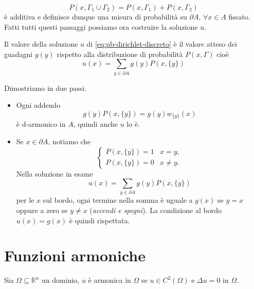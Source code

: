 \documentclass[10pt,a4paper,twoside,openright]{book}
\begin{document}
\begin{equation*}
	P( x,\Gamma _{1} \cup \Gamma _{2}) =P(x,\Gamma _{1}) +P(x,\Gamma _{2})
\end{equation*}
è additiva e definisce dunque una misura di probabilità su $\displaystyle \partial A$, $\displaystyle \forall x\in A$ fissato. Fatti tutti questi passaggi possiamo ora costruire la soluzione $\displaystyle u$.
\begin{theorem}
	Il valore della soluzione $u$ di \eqref{eq:pb-dirichlet-discreto} è il valore atteso dei guadagni $g(y)$ rispetto alla distribuzione di probabilità $P(x,\Gamma)$ cioè
	\begin{equation*}
		u(x) =\sum _{y\in \partial A} g(y) P(x,\{y\})
	\end{equation*}
\end{theorem}
\begin{dimostrazione} Dimostriamo in due passi.
	\begin{itemize}
		\item Ogni addendo
		\begin{equation*}
			g(y) P(x,\{y\}) =g(y) w_{\{y\}}(x)
		\end{equation*}
		è d-armonico in $A$, quindi anche $u$ lo è.

		\item Se $x\in \partial A$, notiamo che
		\begin{equation*}
			\begin{cases}
				P(x,\{y\}) =1 & x=y,     \\
				P(x,\{y\}) =0 & x\neq y.
			\end{cases}
		\end{equation*}
		Nella soluzione in esame
		\begin{equation*}
			u(x) =\sum _{y\in \partial A} g(y) P(x,\{y\})
		\end{equation*}
		per le $x$ sul bordo, ogni termine nella somma è uguale a $g(x)$ se $y=x$ oppure a zero se $\displaystyle y\neq x$ (\textit{accendi e spegni}).
		La condizione al bordo $u(x) =g(x)$ è quindi rispettata.
	\end{itemize}
\end{dimostrazione}
\section{Funzioni armoniche}

Sia $\displaystyle \Omega \subseteq \mathbb{R}^{n}$ un dominio, $\displaystyle u$ è armonica in $\displaystyle \Omega $ se $\displaystyle u\in C^{2}(\Omega)$ e $\displaystyle \Delta u=0$ in $\displaystyle \Omega $. 
\end{document}
